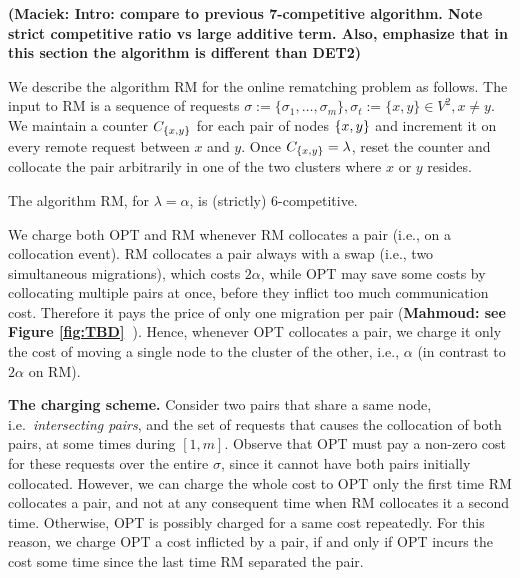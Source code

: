 \documentclass[manuscript,screen=true, review, anonymous]{acmart}
\newcommand{\OPT}{\textsf{OPT}\xspace}
\newcommand{\RM}{\textsf{RM}\xspace} %
\DeclarePairedDelimiter\set{\{}{\}}
\newcommand\mahmoud[1]{\color{orange}\textbf{Mahmoud: #1~}\color{black}}
\newcommand\maciek[1]{\color{brown}\textbf{(Maciek: #1)}\color{black}}
\begin{document}
\maciek{Intro: compare to previous 7-competitive algorithm. Note strict competitive ratio vs large additive term. Also, emphasize that in this section the algorithm is different than DET2}

We describe the algorithm \RM for the online rematching problem as follows.
The input to \RM is a sequence of  requests
$\sigma:=\{\sigma_1,\dots, \sigma_m\}, \sigma_t:=\{x,y\} \in V^2, x \neq y$.
We maintain a counter $C_{\set{x,y}}$ for each pair of nodes $\set{x,y}$ and increment it on every remote request between $x$ and $y$.
Once $C_{\set{x,y}} = \lambda$,
reset the counter and collocate the pair arbitrarily in one of the two clusters where $x$ or $y$ resides.

\begin{theorem} \label{thm:k=2}
	The algorithm \RM, for $\lambda=\alpha$, is (strictly) 6-competitive.
\end{theorem}


We charge both \OPT and \RM whenever \RM collocates a pair (i.e., on a collocation event).
\RM collocates a pair always with a swap (i.e., two simultaneous migrations),
which  costs $2\alpha$,
while OPT may save some costs by collocating multiple pairs at once, 
 before they inflict too much communication cost.
 Therefore it pays the price of only one migration per pair  (\mahmoud{see Figure \ref{fig:TBD}}).
Hence,
whenever \OPT collocates a pair,
we charge it only the cost of moving a single node to the cluster of the other,
i.e., $\alpha$ (in contrast to $2\alpha$ on \RM).

\textbf{The charging scheme.}
Consider two  pairs that share a same node, 
i.e.~\emph{intersecting pairs},
and the set of requests that causes the collocation of both pairs,
at some  times during  $[1,m]$.
Observe that \OPT must pay a non-zero cost
for these requests over the entire $\sigma$,
since it cannot have both pairs initially collocated.
%
%
However,
we can charge the whole cost to \OPT only the first time \RM collocates a pair,
and not at any consequent time when \RM collocates it a second time.
Otherwise,
 \OPT is possibly charged for a same cost repeatedly.
For this reason,
we charge \OPT a cost inflicted by a pair,
if and only if  \OPT incurs the cost some time since the last time \RM separated the pair.
\end{document}
